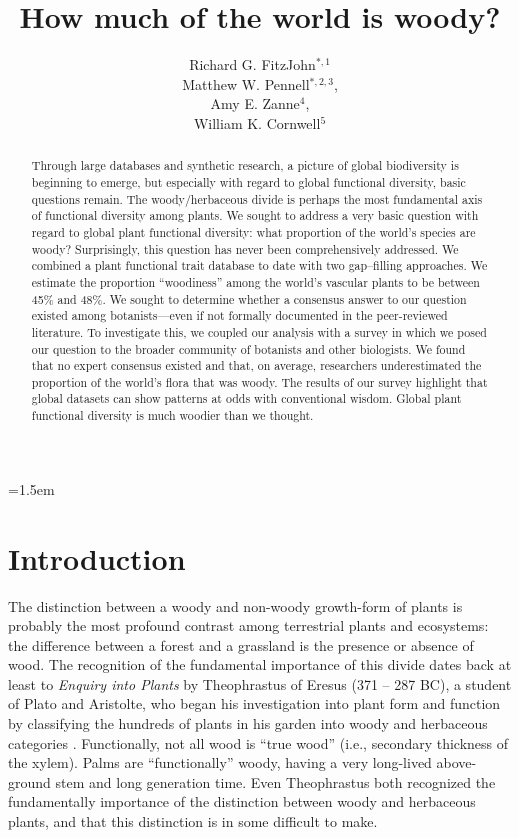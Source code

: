 \documentclass[12pt]{article}
\title{How much of the world is woody?}
\author{
Richard G. FitzJohn$^{*,1}$\\ Matthew W. Pennell$^{*,2,3}$,\\ Amy E. Zanne$^{4}$,\\ William K. Cornwell$^{5}$
}
\date{}
\affiliation{\noindent
$^*$ These authors contributed equally}
\begin{document}
\mstitlepage
\parindent=1.5em
\addtolength{\parskip}{.3em}

\begin{abstract}

%
Through large databases and synthetic research, a picture of global biodiversity is beginning to emerge, but especially with regard to global functional diversity, basic questions remain.   The woody/herbaceous divide is perhaps the most fundamental axis of functional diversity among plants.  We sought to address a very basic question with regard to global plant functional diversity: what proportion of the world's species are woody? Surprisingly, this question has never been comprehensively addressed.  We combined a plant functional trait database to date with two gap--filling approaches.  We estimate the proportion ``woodiness'' among the world's vascular plants to be between 45\% and 48\%.  We sought to determine whether a consensus answer to our question existed among botanists---even if not formally documented in the peer-reviewed literature. To investigate this, we coupled our analysis with a survey in which we posed our question to the broader community of botanists and other biologists.  We found that no expert consensus existed and that, on average, researchers underestimated the proportion of the world's flora that was woody. The results of our survey highlight that global datasets can show patterns at odds with conventional wisdom.  Global plant functional diversity is much woodier than we thought.  
\end{abstract}

\section{Introduction}


%
The distinction between a woody and non-woody growth-form of plants is
probably the most profound contrast among terrestrial plants and
ecosystems: the difference between a forest and a grassland is the
presence or absence of wood. The recognition of the fundamental
importance of this divide dates back at least to \textit{Enquiry into
  Plants} by Theophrastus of Eresus (371 -- 287 BC), a student of
Plato and Aristolte, who began his investigation into plant form and
function by classifying the hundreds of plants in his garden into
woody and herbaceous categories \citep{theophrastus1916enquiry}. Functionally, not all wood is ``true wood'' (i.e., secondary thickness of the xylem).  Palms are
``functionally'' woody, having a very long-lived above-ground stem and long generation time.  Even Theophrastus both recognized the fundamentally importance of the  distinction between woody and herbaceous plants, and that this distinction is in some difficult to make.   
\end{document}
